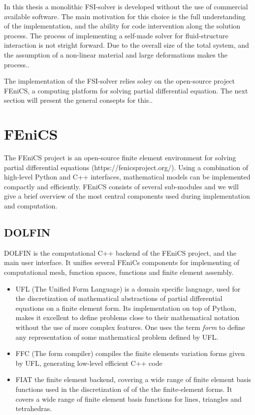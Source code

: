 In this thesis a monolithic FSI-solver is developed without the use of commercial available software. The main motivation for this choice is the full understanding of the implementation, and the ability for code intervention along the solution process. The process of implementing a self-made solver for fluid-structure interaction is not stright forward. Due to the overall size of the total system,  and the assumption of a non-linear material and large deformations makes the process..

The implementation of the FSI-solver relies soley on the open-source project FEniCS, a computing platform for solving partial differential equation. The next section will present the general consepts for this.. 


\section{FEniCS}
The FEniCS project is an open-source finite element environment for solving partial differential equations (https://fenicsproject.org/). Using a combination of high-level Python and C++ interfaces, mathematical models can be implemented compactly and efficiently. FEniCS consists of several sub-modules and we will give a brief overview of the most central components used during implementation and computation.


\subsection{DOLFIN}
DOLFIN is the computational C++ backend of the FEniCS project, and the main user interface. It unifies several FEniCs components for implementing of computational mesh, function spaces, functions and finite element assembly. 

\begin{itemize} 
\item UFL (The Unified Form Language)  is a domain specific language, used for the discretization of mathematical abstractions of partial differential equations on a finite element form. Its implementation on top of Python, makes it excellent to define problems close to their mathematical notation without the use of more complex features. One uses the term \textit{form} to define any representation of some mathematical problem defined by UFL.   

\item FFC (The form compiler) compiles the finite elements variation forms given by UFL, generating low-level efficient C++ code 

\item FIAT the finite element backend, covering a wide range of finite element basis functions used in the discretization of of the  the finite-element forms. It covers a wide range of finite element basis functions for lines, triangles and tetrahedras.

\end{itemize}  


